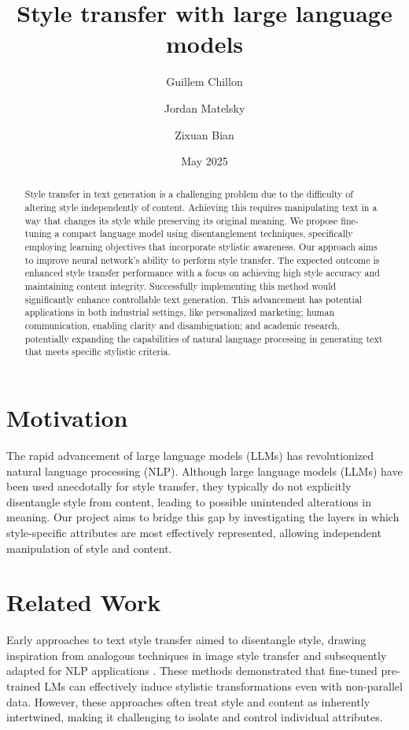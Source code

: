 \documentclass{article}
\title{Style transfer with large language models}
\author[1]{Guillem Chillon}
\author[2]{Jordan Matelsky}
\author[3]{Zixuan Bian}
\affil[1]{guillemc@seas.upenn.edu}
\affil[2]{matelsky@upenn.edu}
\affil[3]{bianzx@seas.upenn.edu}
\date{May 2025}
\begin{document}
\maketitle

\begin{abstract}
Style transfer in text generation is a challenging problem due to the difficulty of altering style independently of content.
Achieving this requires manipulating text in a way that changes its style while preserving its original meaning.
We propose fine-tuning a compact language model using disentanglement techniques, specifically employing learning objectives that incorporate stylistic awareness.
Our approach aims to improve neural network's ability to perform style transfer. The expected outcome is enhanced style transfer performance with a focus on achieving high style accuracy and maintaining content integrity.
Successfully implementing this method would significantly enhance controllable text generation.
This advancement has potential applications in both industrial settings, like personalized marketing; human communication, enabling clarity and disambiguation; and academic research, potentially expanding the capabilities of natural language processing in generating text that meets specific stylistic criteria.

\end{abstract}

\section{Motivation}

The rapid advancement of large language models (LLMs) has revolutionized natural language processing (NLP). Although large language models (LLMs) have been used anecdotally for style transfer, they typically do not explicitly disentangle style from content, leading to possible unintended alterations in meaning. Our project aims to bridge this gap by investigating the layers in which style-specific attributes are most effectively represented, allowing independent manipulation of style and content.

\section{Related Work}
Early approaches to text style transfer aimed to disentangle style, drawing inspiration from analogous techniques in image style transfer \citep{gatys2016image, zhu2017unpaired} and subsequently adapted for NLP applications \citep{john2019disentangled, patel2022low}. These methods demonstrated that fine-tuned pre-trained LMs can effectively induce stylistic transformations even with non-parallel data. However, these approaches often treat style and content as inherently intertwined, making it challenging to isolate and control individual attributes.
\end{document}
